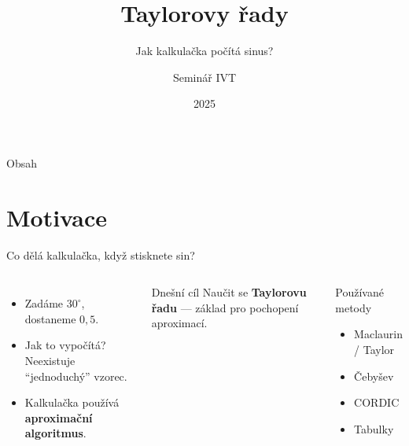 \documentclass[12pt]{beamer}
\title{Taylorovy řady}
\subtitle{Jak kalkulačka počítá sinus?}
\author{Seminář IVT}
\institute{3.~ročník gymnázia}
\date{2025}
\newcommand{\uv}[1]{\enquote{#1}}
\begin{document}

\begin{frame}
    \titlepage
\end{frame}

\begin{frame}{Obsah}
    \tableofcontents
\end{frame}

\section{Motivace}

\begin{frame}{Co dělá kalkulačka, když stisknete sin?}

    \begin{columns}
        \begin{itemize}
            \item Zadáme $30^\circ$, dostaneme $0{,}5$.
            \pause
            \item Jak to vypočítá? Neexistuje \uv{jednoduchý} vzorec.
            \pause
            \item Kalkulačka používá \textbf{aproximační algoritmus}.
        \end{itemize}

        \bigskip
        \begin{block}{Dnešní cíl}
            Naučit se \textbf{Taylorovu řadu} ---
            základ pro pochopení aproximací.
        \end{block}

        \centering
        \begin{block}{Používané metody}
            \begin{itemize}
                \item Maclaurin / Taylor
                \item Čebyšev
                \item CORDIC
                \item Tabulky
            \end{itemize}
        \end{block}
    \end{columns}

\end{frame}
\end{document}
